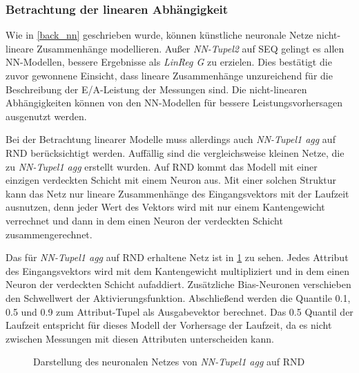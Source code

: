 \documentclass[
	twoside,
	12pt,
	a4paper,
	BCOR10mm,
	DIV14,
	listof=totoc,
	bibliography=totoc,
	headsepline
]{scrreprt}
\begin{document}
\subsubsection{Betrachtung der linearen Abhängigkeit}
Wie in \ref{back_nn} geschrieben wurde, können künstliche neuronale Netze nicht-lineare Zusammenhänge modellieren.
Außer \textit{NN-Tupel2} auf SEQ gelingt es allen NN-Modellen, bessere Ergebnisse als \textit{LinReg G} zu erzielen. Dies bestätigt die zuvor gewonnene Einsicht, dass lineare Zusammenhänge unzureichend für die Beschreibung der E/A-Leistung der Messungen sind.
Die nicht-linearen Abhängigkeiten können von den NN-Modellen für bessere Leistungsvorhersagen ausgenutzt werden.\medskip

Bei der Betrachtung linearer Modelle muss allerdings auch \textit{NN-Tupel1 agg} auf RND berücksichtigt werden.
Auffällig sind die vergleichsweise kleinen Netze, die zu \textit{NN-Tupel1 agg} erstellt wurden.
Auf RND kommt das Modell mit einer einzigen verdeckten Schicht mit einem Neuron aus.
Mit einer solchen Struktur kann das Netz nur lineare Zusammenhänge des Eingangsvektors mit der Laufzeit ausnutzen, denn jeder Wert des Vektors wird mit nur einem Kantengewicht verrechnet und dann in dem einen Neuron der verdeckten Schicht zusammengerechnet.\medskip

Das für \textit{NN-Tupel1 agg} auf RND erhaltene Netz ist in \ref{fig:agg_net} zu sehen.
Jedes Attribut des Eingangsvektors wird mit dem Kantengewicht multipliziert und in dem einen Neuron der verdeckten Schicht aufaddiert. Zusätzliche Bias-Neuronen verschieben den Schwellwert der Aktivierungsfunktion.
Abschließend werden die Quantile 0.1, 0.5 und 0.9 zum Attribut-Tupel als Ausgabevektor berechnet. Das 0.5 Quantil der Laufzeit entspricht für dieses Modell der Vorhersage der Laufzeit, da es nicht zwischen Messungen mit diesen Attributen unterscheiden kann.\medskip

\begin{figure}
	\centering
	\caption{Darstellung des neuronalen Netzes von \textit{NN-Tupel1 agg} auf RND}
	\label{fig:agg_net}
\end{figure} 
\end{document}
